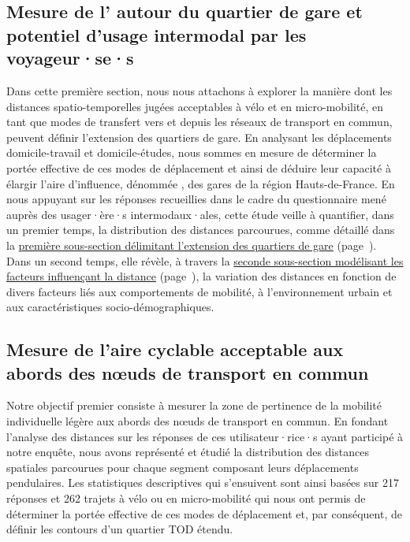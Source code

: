 \begin{refsegment}
\section{Mesure de l' autour du quartier de gare et potentiel d’usage intermodal par les voyageur·se·s
    \label{chap5:aire-secondaire-quartier-gare}
    }

Dans cette première section, nous nous attachons à explorer la manière dont les distances spatio-temporelles jugées acceptables à \gls{vélo} et en \gls{micro-mobilité}, en tant que modes de transfert vers et depuis les réseaux de transport en commun, peuvent définir l'extension des quartiers de gare. En analysant les déplacements domicile-travail et domicile-études, nous sommes en mesure de déterminer la portée effective de ces modes de déplacement et ainsi de déduire leur capacité à élargir l'aire d'influence, dénommée , des gares de la région Hauts-de-France. En nous appuyant sur les réponses recueillies dans le cadre du questionnaire mené auprès des usager·ère·s intermodaux·ales, cette étude veille à quantifier, dans un premier temps, la distribution des distances parcourues, comme détaillé dans la \hyperref[chap5:aire-cyclable-micromobilite]{première sous-section délimitant l'extension des quartiers de gare} (page~\pageref{chap5:aire-cyclable-micromobilite}). Dans un second temps, elle révèle, à travers la \hyperref[chap5:regression-distances]{seconde sous-section modélisant les facteurs influençant la distance} (page~\pageref{chap5:regression-distances}), la variation des distances en fonction de divers facteurs liés aux comportements de mobilité, à l'environnement urbain et aux caractéristiques socio-démographiques.%

\subsection{Mesure de l'aire cyclable acceptable aux abords des nœuds de transport en commun
    \label{chap5:aire-cyclable-micromobilite}
    }

Notre objectif premier consiste à mesurer la zone de pertinence de la mobilité individuelle légère aux abords des nœuds de transport en commun. En fondant l'analyse des distances sur les réponses de ces utilisateur·rice·s ayant participé à notre enquête, nous avons représenté et étudié la distribution des distances spatiales parcourues pour chaque segment composant leurs déplacements pendulaires. Les statistiques descriptives qui s'ensuivent sont ainsi basées sur 217 réponses et 262 trajets à vélo ou en micro-mobilité qui nous ont permis de déterminer la portée effective de ces modes de déplacement et, par conséquent, de définir les contours d'un quartier \acrshort{TOD} étendu.%


\end{refsegment}
